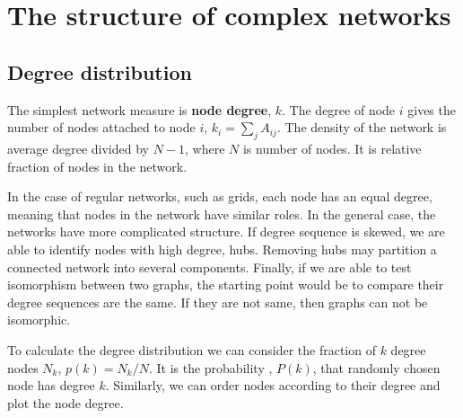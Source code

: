 \section{The structure of complex networks}


\subsection{Degree distribution}

The simplest network measure is \textbf{node degree}, $k$. The degree of node $i$ gives the number of nodes attached to node $i$, $k_i = \sum_j A_{ij}$. The density of the network is average degree divided by $N-1$, where $N$ is number of nodes. It is relative fraction of nodes in the network. 

In the case of regular networks, such as grids, each node has an equal degree, meaning that nodes in the network have similar roles. In the general case, the networks have more complicated structure. If degree sequence is skewed, we are able to identify nodes with high degree, hubs. Removing hubs may partition a connected network into several components. Finally, if we are able to test isomorphism between two graphs, the starting point would be to compare their degree sequences are the same. If they are not same, then graphs can not be isomorphic.

To calculate the degree distribution we can consider the fraction of $k$ degree nodes $N_k$, $p(k) = N_k/N$. It is the probability , $P(k)$, that randomly chosen node has degree $k$. Similarly, we can order nodes according to their degree and plot the node degree.




